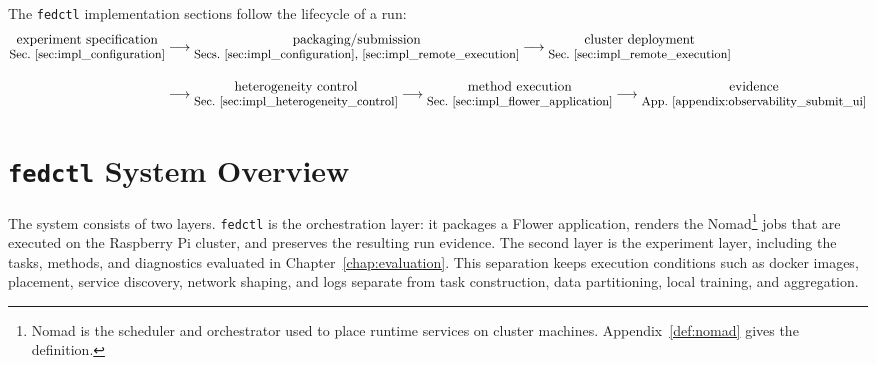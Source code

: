The \texttt{fedctl} implementation sections follow the lifecycle of a run:
\[
\begin{aligned}
\begin{array}{@{}c@{}}\text{experiment specification}\\[-0.1em]\text{\small Sec.~\ref{sec:impl_configuration}}\end{array}
&\longrightarrow
\begin{array}{@{}c@{}}\text{packaging/submission}\\[-0.1em]\text{\small Secs.~\ref{sec:impl_configuration}, \ref{sec:impl_remote_execution}}\end{array}
\longrightarrow
\begin{array}{@{}c@{}}\text{cluster deployment}\\[-0.1em]\text{\small Sec.~\ref{sec:impl_remote_execution}}\end{array}
\\[0.85em]
&\longrightarrow
\begin{array}{@{}c@{}}\text{heterogeneity control}\\[-0.1em]\text{\small Sec.~\ref{sec:impl_heterogeneity_control}}\end{array}
\longrightarrow
\begin{array}{@{}c@{}}\text{method execution}\\[-0.1em]\text{\small Sec.~\ref{sec:impl_flower_application}}\end{array}
\longrightarrow
\begin{array}{@{}c@{}}\text{evidence}\\[-0.1em]\text{\small App.~\ref{appendix:observability_submit_ui}}\end{array}
\end{aligned}
\]

\FloatBarrier
\section{\texttt{fedctl} System Overview}
\label{sec:impl_overview}

The system consists of two layers. \texttt{fedctl} is the orchestration layer: it packages a Flower application, renders the Nomad\footnote{Nomad is the scheduler and orchestrator used to place runtime services on cluster machines. Appendix~\ref{def:nomad} gives the definition.} jobs that are executed on the Raspberry Pi cluster, and preserves the resulting run evidence. The second layer is the experiment layer, including the tasks, methods, and diagnostics evaluated in Chapter~\ref{chap:evaluation}. This separation keeps execution conditions such as docker images, placement, service discovery, network shaping, and logs separate from task construction, data partitioning, local training, and aggregation.

